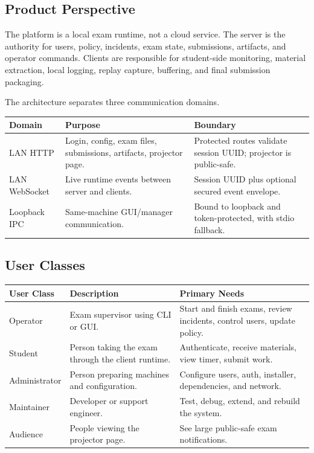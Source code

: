\documentclass[12pt,a4paper]{article}
\begin{document}
\subsection{Product Perspective}

The platform is a local exam runtime, not a cloud service. The server is the
authority for users, policy, incidents, exam state, submissions, artifacts, and
operator commands. Clients are responsible for student-side monitoring,
material extraction, local logging, replay capture, buffering, and final
submission packaging.

The architecture separates three communication domains.

\begin{longtable}{L{0.20\textwidth} L{0.35\textwidth} L{0.35\textwidth}}
\textbf{Domain} & \textbf{Purpose} & \textbf{Boundary} \\
\hline
LAN HTTP & Login, config, exam files, submissions, artifacts, projector page. & Protected routes validate session UUID; projector is public-safe. \\
LAN WebSocket & Live runtime events between server and clients. & Session UUID plus optional secured event envelope. \\
Loopback IPC & Same-machine GUI/manager communication. & Bound to loopback and token-protected, with stdio fallback. \\
\end{longtable}

\subsection{User Classes}

\begin{longtable}{L{0.22\textwidth} L{0.32\textwidth} L{0.36\textwidth}}
\textbf{User Class} & \textbf{Description} & \textbf{Primary Needs} \\
\hline
Operator & Exam supervisor using CLI or GUI. & Start and finish exams, review incidents, control users, update policy. \\
Student & Person taking the exam through the client runtime. & Authenticate, receive materials, view timer, submit work. \\
Administrator & Person preparing machines and configuration. & Configure users, auth, installer, dependencies, and network. \\
Maintainer & Developer or support engineer. & Test, debug, extend, and rebuild the system. \\
Audience & People viewing the projector page. & See large public-safe exam notifications. \\
\end{longtable}
\end{document}
